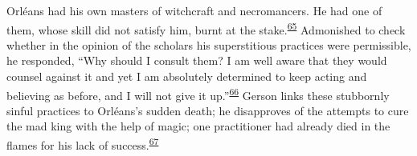 Orléans had his own masters of witchcraft and necromancers. He had one
of them, whose skill did not satisfy him, burnt at the
stake.\textsuperscript{\protect\hypertarget{18_Chapter_Eleven__THE_FORMS_OF_THO.xhtmlux5cux23id_504}{\protect\hyperlink{23_NOTES.xhtmlux5cux23id_505}{65}}}
Admonished to check whether in the opinion of the scholars his
superstitious practices were permissible, he responded, ``Why should I
consult them? I am well aware that they would counsel against it and yet
I am absolutely determined to keep acting and believing as before, and I
will not give it
up.''\textsuperscript{\protect\hypertarget{18_Chapter_Eleven__THE_FORMS_OF_THO.xhtmlux5cux23id_502}{\protect\hyperlink{23_NOTES.xhtmlux5cux23id_503}{66}}}
Gerson links
\protect\hypertarget{18_Chapter_Eleven__THE_FORMS_OF_THO.xhtmlux5cux23page_288}{}{}these
stubbornly sinful practices to Orléans's sudden death; he disapproves of
the attempts to cure the mad king with the help of magic; one
practitioner had already died in the flames for his lack of
success.\textsuperscript{\protect\hypertarget{18_Chapter_Eleven__THE_FORMS_OF_THO.xhtmlux5cux23id_500}{\protect\hyperlink{23_NOTES.xhtmlux5cux23id_501}{67}}}


